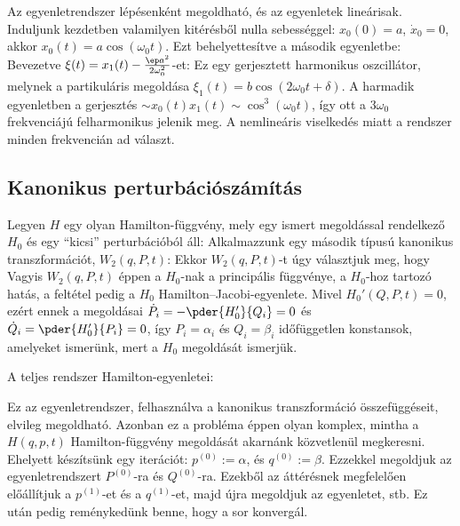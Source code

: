   Az egyenletrendszer lépésenként megoldható, és az egyenletek lineárisak.
   Induljunk kezdetben valamilyen kitérésből nulla sebességgel: $x_0(0)=a$, $\dot x_0=0$, akkor $x_0(t)=a\cos(\omega_0 t)$.
   Ezt behelyettesítve a második egyenletbe:
   Bevezetve $\xi(t)=x_1(t)-\frac{\ep a^2}{2\omega_0^2}$-et:
   Ez egy gerjesztett harmonikus oszcillátor, melynek a partikuláris megoldása $\xi_1(t)=b\cos(2\omega_0 t+\delta)$.
   A harmadik egyenletben a gerjesztés $\sim x_0(t)x_1(t)\sim\cos^3(\omega_0 t)$, így ott a $3\omega_0$ frekvenciájú felharmonikus jelenik meg.
   A nemlineáris viselkedés miatt a rendszer minden frekvencián ad választ. 
   
  \subsection{Kanonikus perturbációszámítás}\label{ss:11-kanonikusperturbacioszamitas}
   
   Legyen $H$ egy olyan Hamilton-függvény, mely egy ismert megoldással rendelkező $H_0$ és egy ``kicsi'' perturbációból áll:
   Alkalmazzunk egy második típusú kanonikus transzformációt, $W_2(q,P,t)$:
   Ekkor
   $W_2(q,P,t)$-t úgy választjuk meg, hogy 
   Vagyis $W_2(q,P,t)$ éppen a $H_0$-nak a principális függvénye, a $H_0$-hoz tartozó hatás, a feltétel pedig a $H_0$ Hamilton--Jacobi-egyenlete.
   Mivel $H_0'(Q,P,t)=0$, ezért ennek a megoldásai $\dot P_i=-\pder{H'_0}{Q_i}=0$ és $\dot Q_i=\pder{H'_0}{P_i}=0$, így $P_i=\alpha_i$ és $Q_i=\beta_i$ időfüggetlen konstansok, amelyeket ismerünk, mert a $H_0$ megoldását ismerjük. 
   
   A teljes rendszer Hamilton-egyenletei:
   
   Ez az egyenletrendszer, felhasználva a kanonikus transzformáció összefüggéseit, elvileg megoldható.
   Azonban ez a probléma éppen olyan komplex, mintha a $H(q,p,t)$ Hamilton-függvény megoldását akarnánk közvetlenül megkeresni.
   Ehelyett készítsünk egy iterációt: $p^{(0)}:=\alpha$, és $q^{(0)}:=\beta$.
   Ezzekkel megoldjuk az egyenletrendszert $P^{(0)}$-ra és $Q^{(0)}$-ra.
   Ezekből az áttérésnek megfelelően előállítjuk a $p^{(1)}$-et és a $q^{(1)}$-et, majd újra megoldjuk az egyenletet, stb.
   Ez után pedig reménykedünk benne, hogy a sor konvergál. 
   
